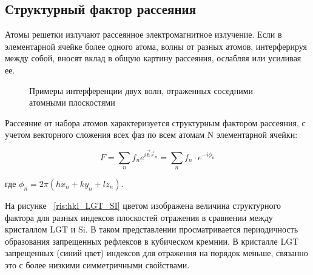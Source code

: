 \subsection{Структурный фактор рассеяния}
\label{sec:structure_factor}
Атомы решетки излучают рассеянное электромагнитное излучение.
Если в элементарной ячейке более одного атома, волны от разных атомов,
 интерферируя между собой, вносят вклад в общую картину рассеяния,
 ослабляя или усиливая ее.

 \begin{figure}[h]
   \centering
   \hfill
   \caption{Примеры интерференции двух волн, отраженных соседними атомными плоскостями}
   \label{ris:interference_by_plate}
 \end{figure}

Рассеяние от набора атомов характеризуется структурным фактором рассеяния,
 с учетом векторного сложения всех фаз по всем атомам N элементарной ячейки:

 \begin{equation}
   F = \sum_{n} f_n e^{ i\vec{h}\vec{r}_n} =   \sum_{n} f_n \cdot e^{-i\phi_n}
  \end{equation}

  где $\phi_n = 2 \pi (hx_n+ky_n+lz_n)$.


На рисунке ~\ref{ris:hkl_LGT_SI} цветом изображена величина структурного фактора для разных
 индексов плоскостей отражения в сравнении между кристаллом LGT и Si.
 В таком представлении просматривается периодичность образования запрещенных
 рефлексов в кубическом кремнии. В кристалле LGT запрещенных (синий цвет)
  индексов для отражения на порядок меньше, связанно это с более низкими
  симметричными свойствами.

